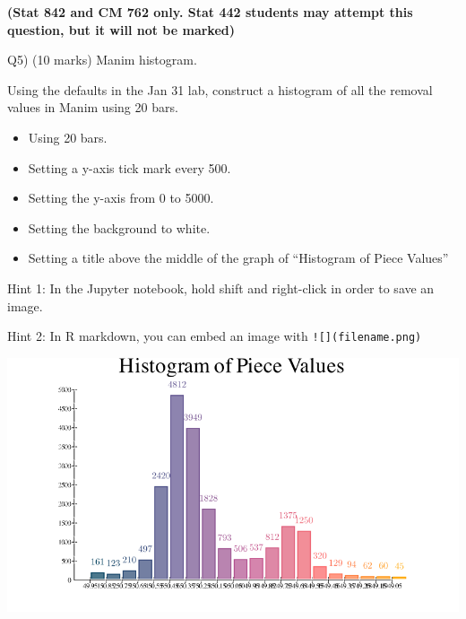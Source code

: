 \documentclass[
]{article}
\providecommand{\tightlist}{%
  \setlength{\itemsep}{0pt}\setlength{\parskip}{0pt}}
\begin{document}
\newpage

\textbf{(Stat 842 and CM 762 only. Stat 442 students may attempt this
question, but it will not be marked)}

Q5) (10 marks) Manim histogram.

Using the defaults in the Jan 31 lab, construct a histogram of all the
removal values in Manim using 20 bars.

\begin{itemize}
\tightlist
\item
  Using 20 bars.
\item
  Setting a y-axis tick mark every 500.
\item
  Setting the y-axis from 0 to 5000.
\item
  Setting the background to white.
\item
  Setting a title above the middle of the graph of ``Histogram of Piece
  Values''
\end{itemize}

Hint 1: In the Jupyter notebook, hold shift and right-click in order to
save an image.

Hint 2: In R markdown, you can embed an image with
\texttt{!{[}{]}(filename.png)}

\includegraphics{HistogramOfRemoveValue_ManimCE_v0.19.0.png}
\end{document}
